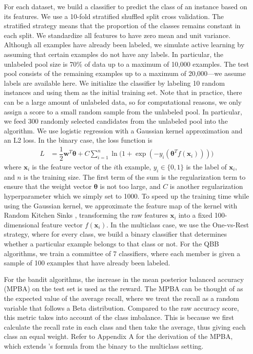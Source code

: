 \documentclass[fleqn,10pt,lineno]{wlpeerj} %
\begin{document}
For each dataset, we build a classifier to predict the class of an instance
based on its features. We use a 10-fold stratified shuffled split cross
validation. The stratified strategy means that the proportion of the classes
remains constant in each split. We standardize all features to have zero mean
and unit variance. Although all examples have already been labeled, we simulate
active learning by assuming that certain examples do not have any labels. In
particular, the unlabeled pool size is 70\% of data up to a maximum of 10,000
examples. The test pool consists of the remaining examples up to a maximum of
20,000---we assume labels are available here. We initialize the classifier by
labeling 10 random instances and using them as the initial training set. Note
that in practice, there can be a large amount of unlabeled data, so for
computational reasons, we only assign a score to a small random sample from the
unlabeled pool. In particular, we feed 300 randomly selected candidates from
the unlabeled pool into the algorithm. We use logistic
regression with a Gaussian kernel approximation and an L2 loss. In the binary
case, the loss function is
\begin{align}
	L &= \dfrac{1}{2} \bm{w}^T \bm{\theta} + C \sum_{i = 1}^n
	      \ln\Big(1 + \exp(-y_i(\bm{\theta}^T f(\bm{x}_i)))\Big)
\end{align}
where $\bm{x}_i$ is the feature vector of the $i$th example, $y_i \in \{0, 1\}$
is the label of $\bm{x}_i$, and $n$ is the training size. The first term of the
sum is the regularization term to ensure that the weight vector $\bm{\theta}$
is not too large, and $C$ is another regularization hyperparameter which we
simply set to 1000. To speed up the training time while using the Gaussian
kernel, we approximate the feature map of the kernel with Random Kitchen Sinks
\citep{rahimi08}, transforming the raw features $\bm{x}_i$ into a fixed
100-dimensional feature vector $f(\bm{x}_i)$. In the multiclass case, we use
the One-vs-Rest strategy, where for every class, we build a binary classifier
that determines whether a particular example belongs to that class or not. For
the QBB algorithms, we train a committee of 7 classifiers, where each member is
given a sample of 100 examples that have already been labeled.

For the bandit algorithms, the increase in the mean posterior balanced accuracy
(MPBA) on the test set is used as the reward. The MPBA can be thought of as the
expected value of the average recall, where we treat the recall as a random
variable that follows a Beta distribution. Compared to the raw accuracy score,
this metric takes into account of the class imbalance. This is because we first
calculate the recall rate in each class and then take the average, thus giving
each class an equal weight. Refer to Appendix A for the derivation of the MPBA,
which extends \cite{brodersen10}'s formula from the binary to the multiclass
setting.
\end{document}
